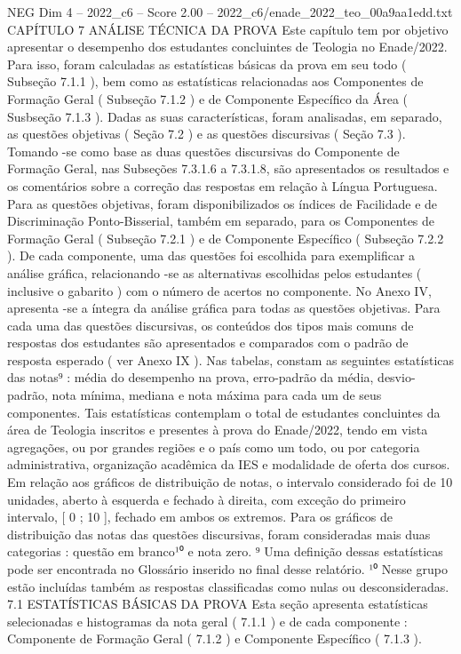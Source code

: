\begin{textsample}{NEG Dim 4 – 2022\_c6 – Score 2.00 – 2022\_c6/enade\_2022\_teo\_00a9aa1edd.txt}  \label{ex:f4_neg_278}
CAPÍTULO 7 ANÁLISE TÉCNICA DA PROVA Este capítulo tem por objetivo apresentar o desempenho dos estudantes concluintes de Teologia no Enade/2022.
Para isso, foram calculadas as estatísticas básicas da prova em seu todo ( Subseção 7.1.1 ), bem como as estatísticas relacionadas aos Componentes de Formação Geral ( Subseção 7.1.2 ) e de Componente Específico da Área ( Susbseção 7.1.3 ).
Dadas as suas características, foram analisadas, em separado, as questões objetivas ( Seção 7.2 ) e as questões discursivas ( Seção 7.3 ).
Tomando -se como base as duas questões discursivas do Componente de Formação Geral, nas Subseções 7.3.1.6 a 7.3.1.8, são apresentados os resultados e os comentários sobre a correção das respostas em relação à Língua Portuguesa.
Para as questões objetivas, foram disponibilizados os índices de Facilidade e de Discriminação Ponto-Bisserial, também em separado, para os Componentes de Formação Geral ( Subseção 7.2.1 ) e de Componente Específico ( Subseção 7.2.2 ).
De cada componente, uma das questões foi escolhida para exemplificar a análise gráfica, relacionando -se as alternativas escolhidas pelos estudantes ( inclusive o gabarito ) com o número de acertos no componente.
No Anexo IV, apresenta -se a íntegra da análise gráfica para todas as questões objetivas.
Para cada uma das questões discursivas, os conteúdos dos tipos mais comuns de respostas dos estudantes são apresentados e comparados com o padrão de resposta esperado ( ver Anexo IX ).
Nas tabelas, constam as seguintes estatísticas das notas⁹ : média do desempenho na prova, erro-padrão da média, desvio-padrão, nota mínima, mediana e nota máxima para cada um de seus componentes.
Tais estatísticas contemplam o total de estudantes concluintes da área de Teologia inscritos e presentes à prova do Enade/2022, tendo em vista agregações, ou por grandes regiões e o país como um todo, ou por categoria administrativa, organização acadêmica da IES e modalidade de oferta dos cursos.
Em relação aos gráficos de distribuição de notas, o intervalo considerado foi de 10 unidades, aberto à esquerda e fechado à direita, com exceção do primeiro intervalo, [ 0 ; 10 ], fechado em ambos os extremos.
Para os gráficos de distribuição das notas das questões discursivas, foram consideradas mais duas categorias : questão em branco¹⁰ e nota zero. ⁹ Uma definição dessas estatísticas pode ser encontrada no Glossário inserido no final desse relatório. ¹⁰ Nesse grupo estão incluídas também as respostas classificadas como nulas ou desconsideradas. 7.1 ESTATÍSTICAS BÁSICAS DA PROVA Esta seção apresenta estatísticas selecionadas e histogramas da nota geral ( 7.1.1 ) e de cada componente : Componente de Formação Geral ( 7.1.2 ) e Componente Específico ( 7.1.3 ).

\end{textsample}
